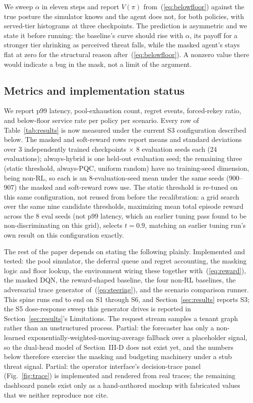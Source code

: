\documentclass[conference]{IEEEtran}
\begin{document}
We sweep $\alpha$ in eleven steps and report $V(\pi)$ from~(\ref{eq:belowfloor})
against the true posture the simulator knows and the agent
does not, for both policies, with served-tier histograms at three
checkpoints. The prediction is asymmetric and we state it
before running: the baseline's curve should rise with $\alpha$, its
payoff for a stronger tier shrinking as perceived threat falls,
while the masked agent's stays flat at zero for the structural
reason after~(\ref{eq:belowfloor}). A nonzero value there would indicate a bug
in the mask, not a limit of the argument.

\subsection{Metrics and implementation status}

We report p99 latency, pool-exhaustion count, regret events,
forced-rekey ratio, and below-floor service rate per policy per
scenario. Every row of Table~\ref{tab:results} is now measured under
the current S3 configuration described below. The masked and
soft-reward rows report means and standard deviations over 3
independently trained checkpoints $\times$ 8 evaluation seeds each
(24 evaluations); always-hybrid is one held-out evaluation seed;
the remaining three (static threshold, always-PQC, uniform random)
have no training-seed dimension, being non-RL, so each is an
8-evaluation-seed mean under the same seeds (900--907) the masked
and soft-reward rows use. The static threshold is re-tuned on this
same configuration, not reused from before the recalibration: a
grid search over the same nine candidate thresholds, maximizing
mean total episode reward across the 8 eval seeds (not p99 latency,
which an earlier tuning pass found to be non-discriminating on this
grid), selects $t=0.9$, matching an earlier tuning run's own result
on this configuration exactly.

The rest of the paper depends on stating the following
plainly. Implemented and tested: the pool simulator, the deferral queue and regret accounting, the masking logic and
floor lookup, the environment wiring these together with~(\ref{eq:reward}),
the masked DQN, the reward-shaped baseline, the four non-RL baselines, the adversarial trace generator of~(\ref{eq:steering}), and the
scenario comparison runner. This spine runs end to end on
S1 through S6, and Section~\ref{sec:results} reports S3; the S5 dose-response
sweep this generator drives is reported in Section~\ref{sec:results}'s
Limitations. The request stream samples a tenant graph rather
than an unstructured process. Partial: the forecaster has only
a non-learned exponentially-weighted-moving-average fallback
over a placeholder signal, so the dual-head model of Section~III-D
does not exist yet, and the numbers below therefore exercise
the masking and budgeting machinery under a stub threat
signal. Partial: the operator interface's decision-trace panel
(Fig.~\ref{fig:trace}) is implemented and rendered from real traces; the
remaining dashboard panels exist only as a hand-authored mockup
with fabricated values that we neither reproduce nor cite.
\end{document}

